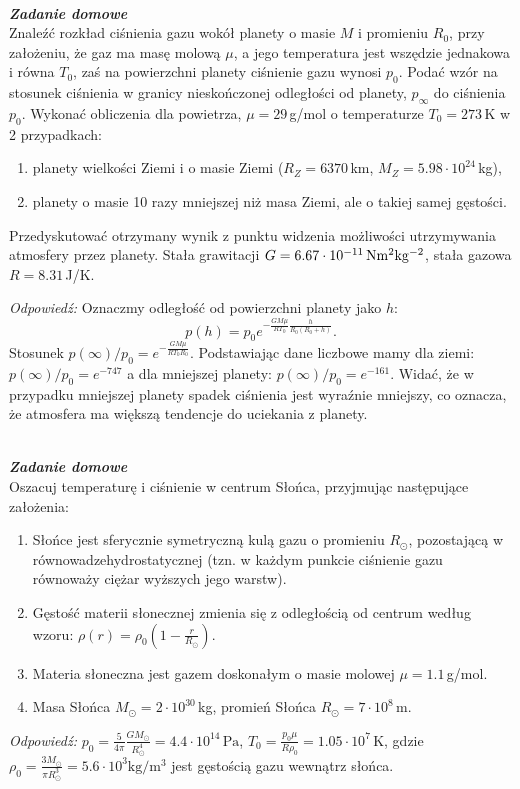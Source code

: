 \documentclass[11pt,a4paper]{article}
\newcounter{zaddom}\newcommand{\zaddom}[1][]{\addtocounter{zaddom}{1} ~\\  {\bf \emph{Zadanie domowe \arabic{zaddom} #1 }} \\}
\renewcommand{\t}[1]{\textrm{#1}}
\begin{document}
\zaddom
Znaleźć rozkład ciśnienia gazu wokół planety o masie $M$ i promieniu $R_0$, przy założeniu,
że gaz ma masę molową $\mu$, a jego temperatura jest wszędzie jednakowa i równa $T_0$,
zaś na powierzchni planety ciśnienie gazu wynosi $p_0$. Podać wzór na stosunek ciśnienia
w granicy nieskończonej odległości od planety, $p_\infty$ do ciśnienia $p_0$.
Wykonać obliczenia dla powietrza, $\mu=29\,$g/mol o temperaturze $T_0 = 273\,$K
w 2 przypadkach:
\begin{enumerate}
\item planety wielkości Ziemi i o masie Ziemi ($R_Z = 6370\,$km, $M_Z = 5.98\cdot10^{24}\,$kg),
\item planety o masie 10 razy mniejszej niż masa Ziemi, ale o takiej samej gęstości.
\end{enumerate}
Przedyskutować otrzymany wynik z punktu widzenia możliwości utrzymywania atmosfery przez planety.
Stała grawitacji $G = 6.67 \cdot 10^{-11}\,{\rm N m^2 kg^{-2}}$,
stała gazowa $R = 8.31\,$J/K.
\newline

\emph{Odpowiedź:}
Oznaczmy odległość od powierzchni planety jako $h$:
$$p(h) = p_0 e^{-\frac{G M \mu}{R T_0} \frac{h}{R_0(R_0+h)}}.$$
Stosunek $p(\infty)/p_0 = e^{-\frac{G M \mu}{R T_0 R_0}}.$ Podstawiając dane liczbowe mamy dla ziemi:
$p(\infty)/p_0 = e^{-747}$ a dla mniejszej planety: $p(\infty)/p_0 = e^{-161} $. Widać, że w przypadku mniejszej planety spadek ciśnienia jest wyraźnie mniejszy, co oznacza, że  atmosfera ma większą tendencje do uciekania z planety.

\zaddom
Oszacuj temperaturę i ciśnienie w centrum Słońca, przyjmując następujące założenia:
\begin{enumerate}
\item Słońce jest sferycznie symetryczną kulą gazu o promieniu $R_\odot$,
pozostającą w równowadze\linebreak hydrostatycznej
(tzn. w każdym punkcie ciśnienie gazu równoważy ciężar wyższych
jego warstw).
\item Gęstość materii słonecznej zmienia się z odległością od centrum według wzoru:
$\rho(r) = \rho_0 \left( 1 - \frac{r}{R_\odot}\right )$.
\item Materia słoneczna jest gazem doskonałym o masie molowej $\mu = 1.1\,$g/mol.
\item Masa Słońca $M_\odot = 2\cdot 10^{30}\,$kg,
promień Słońca $R_\odot = 7\cdot10^8\,$m.
\end{enumerate}
\vspace{0.5cm}

\emph{Odpowiedź:}
$p_0 = \frac{5}{4 \pi} \frac{G M_\odot}{R_\odot^4} = 4.4 \cdot 10^{14}\, \t{Pa}$, $T_0 = \frac{p_0 \mu}{R \rho_0}  = 1.05 \cdot 10^7\, \t{K}$,
gdzie $\rho_0 = \frac{3 M_\odot}{\pi R_\odot^3} = 5.6 \cdot 10^3 \t{kg}/\t{m}^3$ jest gęstością gazu wewnątrz słońca.

\end{document}
